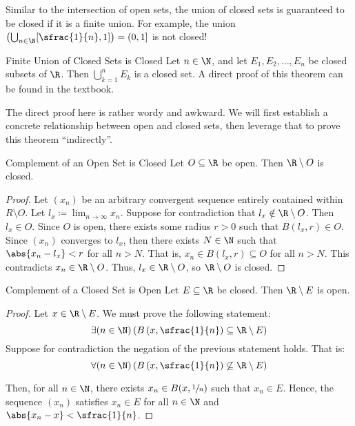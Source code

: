 Similar to the intersection of open sets, the union of closed sets is guaranteed to be closed if it is a finite union. For example, the union $\left( \bigcup_{n \in \N} [\sfrac{1}{n}, 1]\right) = (0,1]$ is not closed!

\begin{thmbox}{Finite Union of Closed Sets is Closed}{}
    Let $n \in \N$, and let $E_1, E_2, \ldots, E_n$ be closed subsets of $\R$. Then $\bigcup_{k=1}^n E_k$ is a closed set.
    \tcblower
    A direct proof of this theorem can be found in the textbook.
\end{thmbox}

The direct proof here is rather wordy and awkward. We will first establish a concrete relationship between open and closed sets, then leverage that to prove this theorem ``indirectly''.

\begin{thmbox}{Complement of an Open Set is Closed}{}
    Let $O \subseteq \R$ be open. Then $\R \setminus O$ is closed.
    \tcblower
    \begin{proof}
        Let $(x_n)$ be an arbitrary convergent sequence entirely contained within $R \setminus O$. Let $l_x \coloneq \lim_{n\to\infty} x_n$. Suppose for contradiction that $l_x \notin \R \setminus O$. Then $l_x \in O$. Since $O$ is open, there exists some radius $r > 0$ such that $B(l_x, r) \in O$. Since $(x_n)$ converges to $l_x$, then there exists $N \in \N$ such that $\abs{x_n - l_x} < r$ for all $n > N$. That is, $x_n \in B(l_x, r) \subseteq O$ for all $n > N$. This contradicts $x_n \in \R \setminus O$. Thus, $l_x \in \R \setminus O$, so $\R \setminus O$ is closed.
    \end{proof}
\end{thmbox}

\begin{thmbox}{Complement of a Closed Set is Open}{}
    Let $E \subseteq \R$ be closed. Then $\R \setminus E$ is open.
    \tcblower
    \begin{proof}
        Let $x \in \R \setminus E$. We must prove the following statement:
        \[ \exists (n \in \N) \left( B \left(x, \sfrac{1}{n} \right) \subseteq \R \setminus E \right) \]
        Suppose for contradiction the negation of the previous statement holds. That is:
        \[ \forall (n \in \N) \left( B \left(x, \sfrac{1}{n} \right) \not \subseteq \R \setminus E \right) \]

        Then, for all $n \in \N$, there exists $x_n \in B(x, \sfrac{1}{n})$ such that $x_n \in E$. Hence, the sequence $(x_n)$ satisfies $x_n \in E$ for all $n \in \N$ and $\abs{x_n - x} < \sfrac{1}{n}$. 
    \end{proof}
\end{thmbox}

